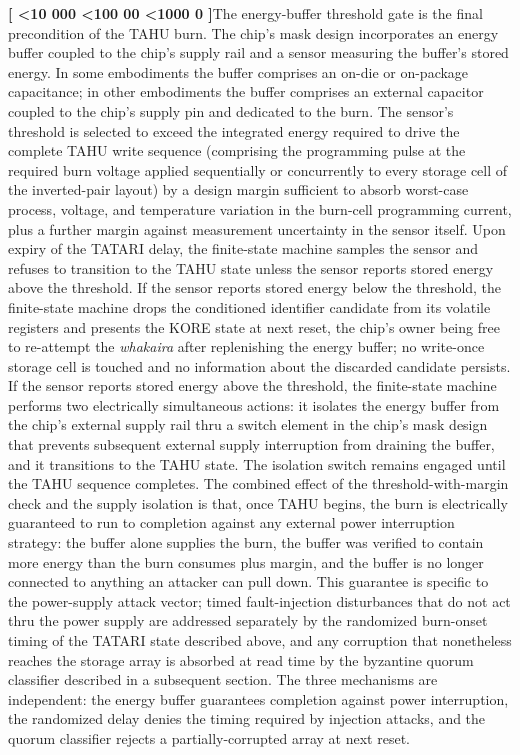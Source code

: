 \documentclass[12pt,letterpaper]{article}
\newcounter{para}
\newcommand{\padzero}{%
  \ifnum\value{para}<10 000\else%
  \ifnum\value{para}<100 00\else%
  \ifnum\value{para}<1000 0\else%
  \fi\fi\fi}
\newcommand{\para}{%
  \refstepcounter{para}\noindent\textbf{[\padzero\arabic{para}]}\hspace{0.5em}\ignorespaces}
\begin{document}
\para The energy-buffer threshold gate is the final precondition of the TAHU burn. The chip's mask design incorporates an energy buffer coupled to the chip's supply rail and a sensor measuring the buffer's stored energy. In some embodiments the buffer comprises an on-die or on-package capacitance; in other embodiments the buffer comprises an external capacitor coupled to the chip's supply pin and dedicated to the burn. The sensor's threshold is selected to exceed the integrated energy required to drive the complete TAHU write sequence (comprising the programming pulse at the required burn voltage applied sequentially or concurrently to every storage cell of the inverted-pair layout) by a design margin sufficient to absorb worst-case process, voltage, and temperature variation in the burn-cell programming current, plus a further margin against measurement uncertainty in the sensor itself. Upon expiry of the TATARI delay, the finite-state machine samples the sensor and refuses to transition to the TAHU state unless the sensor reports stored energy above the threshold. If the sensor reports stored energy below the threshold, the finite-state machine drops the conditioned identifier candidate from its volatile registers and presents the KORE state at next reset, the chip's owner being free to re-attempt the \emph{whakaira} after replenishing the energy buffer; no write-once storage cell is touched and no information about the discarded candidate persists. If the sensor reports stored energy above the threshold, the finite-state machine performs two electrically simultaneous actions: it isolates the energy buffer from the chip's external supply rail thru a switch element in the chip's mask design that prevents subsequent external supply interruption from draining the buffer, and it transitions to the TAHU state. The isolation switch remains engaged until the TAHU sequence completes. The combined effect of the threshold-with-margin check and the supply isolation is that, once TAHU begins, the burn is electrically guaranteed to run to completion against any external power interruption strategy: the buffer alone supplies the burn, the buffer was verified to contain more energy than the burn consumes plus margin, and the buffer is no longer connected to anything an attacker can pull down. This guarantee is specific to the power-supply attack vector; timed fault-injection disturbances that do not act thru the power supply are addressed separately by the randomized burn-onset timing of the TATARI state described above, and any corruption that nonetheless reaches the storage array is absorbed at read time by the byzantine quorum classifier described in a subsequent section. The three mechanisms are independent: the energy buffer guarantees completion against power interruption, the randomized delay denies the timing required by injection attacks, and the quorum classifier rejects a partially-corrupted array at next reset.
\end{document}
